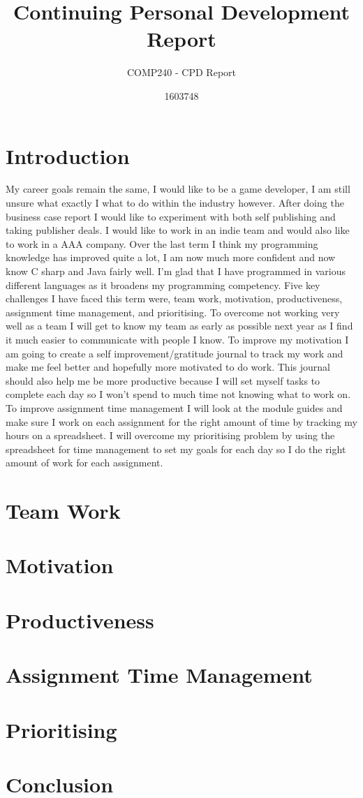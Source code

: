 \documentclass{scrartcl}
\title{Continuing Personal Development Report}
\subtitle{COMP240 - CPD Report}
\author{1603748}
\begin{document}
\maketitle

\section*{Introduction}
My career goals remain the same, I would like to be a game developer, I am still unsure what exactly I what to do within the industry however. After doing the business case report I would like to experiment with both self publishing and taking publisher deals. I would like to work in an indie team and would also like to work in a AAA company. Over the last term I think my programming knowledge has improved quite a lot, I am now much more confident and now know C sharp and Java fairly well. I'm glad that I have programmed in various different languages as it broadens my programming competency. Five key challenges I have faced this term were, team work, motivation, productiveness, assignment time management, and prioritising. To overcome not working very well as a team I will get to know my team as early as possible next year as I find it much easier to communicate with people I know. To improve my motivation I am going to create a self improvement/gratitude journal to track my work and make me feel better and hopefully more motivated to do work. This journal should also help me be more productive because I will set myself tasks to complete each day so I won't spend to much time not knowing what to work on. To improve assignment time management I will look at the module guides and make sure I work on each assignment for the right amount of time by tracking my hours on a spreadsheet. I will overcome my prioritising problem by using the spreadsheet for time management to set my goals for each day so I do the right amount of work for each assignment. 

\section{Team Work}


\section{Motivation}

\section{Productiveness}


\section{Assignment Time Management}


\section{Prioritising}


\section*{Conclusion}
 




\end{document}

